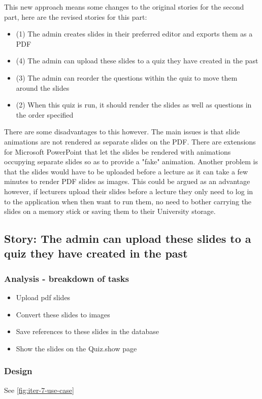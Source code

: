 This new approach means some changes to the original stories for the second part, here are the revised stories for this part:
\begin{itemize}
	\item (1) The admin creates slides in their preferred editor and exports them as a PDF
	\item (4) The admin can upload these slides to a quiz they have created in the past
	\item (3) The admin can reorder the questions within the quiz to move them around the slides
	\item (2) When this quiz is run, it should render the slides as well as questions in the order specified
\end{itemize}

There are some disadvantages to this however. The main issues is that slide animations are not rendered as separate slides on the PDF. There are extensions for Microsoft PowerPoint that let the slides be rendered with animations occupying separate slides so as to provide a "fake" animation. Another problem is that the slides would have to be uploaded before a lecture as it can take a few minutes to render PDF slides as images. This could be argued as an advantage however, if lecturers upload their slides before a lecture they only need to log in to the application when then want to run them, no need to bother carrying the slides on a memory stick or saving them to their University storage.
\newpage

\subsection{Story: The admin can upload these slides to a quiz they have created in the past}
\subsubsection{Analysis - breakdown of tasks}
\begin{itemize}
	\item Upload pdf slides
	\item Convert these slides to images
	\item Save references to these slides in the database
	\item Show the slides on the Quiz.show page
\end{itemize}
\subsubsection{Design}
See \ref{fig:iter-7-use-case}

